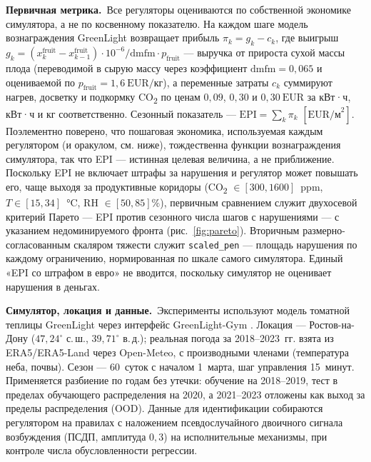 \documentclass[preprint,3p]{elsarticle}
\begin{document}
\textbf{Первичная метрика.}~Все регуляторы оцениваются по собственной экономике симулятора, а
не по косвенному показателю. На каждом шаге модель вознаграждения GreenLight возвращает
прибыль $\pi_k = g_k - c_k$, где выигрыш $g_k = (x^{\text{fruit}}_k -
x^{\text{fruit}}_{k-1})\cdot 10^{-6}/\text{dmfm}\cdot p_{\text{fruit}}$ — выручка от прироста
сухой массы плода (переводимой в сырую массу через коэффициент $\text{dmfm}=0{,}065$ и
оцениваемой по $p_{\text{fruit}}=1{,}6~\text{EUR/кг}$), а переменные затраты $c_k$ суммируют
нагрев, досветку и подкормку CO\textsubscript{2} по ценам $0{,}09$, $0{,}30$ и
$0{,}30~\text{EUR}$ за кВт·ч, кВт·ч и кг соответственно. Сезонный показатель —
$\text{EPI}=\sum_k \pi_k$ $[\text{EUR/м}^2]$. Поэлементно поверено, что пошаговая экономика,
используемая каждым регулятором (и оракулом, см. ниже), тождественна функции вознаграждения
симулятора, так что EPI — истинная целевая величина, а не приближение. Поскольку EPI не
включает штрафы за нарушения и регулятор может повышать его, чаще выходя за продуктивные
коридоры (CO\textsubscript{2} $\in[300,1600]$~ppm, $T\in[15,34]$~°C, RH $\in[50,85]\%$),
первичным сравнением служит двухосевой критерий Парето — EPI против сезонного числа шагов с
нарушениями — с указанием недоминируемого фронта (рис.~\ref{fig:pareto}). Вторичным
размерно-согласованным скаляром тяжести служит \texttt{scaled\_pen} — площадь нарушения по
каждому ограничению, нормированная по шкале самого симулятора. Единый «EPI со штрафом в евро»
не вводится, поскольку симулятор не оценивает нарушения в деньгах.

\textbf{Симулятор, локация и данные.}~Эксперименты используют модель томатной теплицы
GreenLight \citep{katzin2020greenlight} через интерфейс GreenLight-Gym
\citep{vanlaatum2025greenlightgym}. Локация — Ростов-на-Дону ($47{,}24^\circ$ с.\,ш.,
$39{,}71^\circ$ в.\,д.); реальная погода за 2018--2023~гг. взята из ERA5/ERA5-Land через
Open-Meteo, с производными членами (температура неба, почвы). Сезон — 60~суток с началом
1~марта, шаг управления 15~минут. Применяется разбиение по годам без утечки: обучение на
2018--2019, тест в пределах обучающего распределения на 2020, а 2021--2023 отложены как выход
за пределы распределения (OOD). Данные для идентификации собираются регулятором на правилах с
наложением псевдослучайного двоичного сигнала возбуждения (ПСДП, амплитуда $0{,}3$) на
исполнительные механизмы, при контроле числа обусловленности регрессии.
\end{document}
